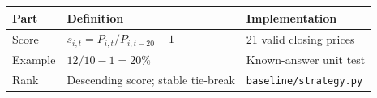 \begin{tabular}{@{}P{3.1cm}P{4.5cm}P{4.9cm}@{}}
\toprule
\textbf{Part} & \textbf{Definition} & \textbf{Implementation} \\
\midrule
Score & $s_{i,t}=P_{i,t}/P_{i,t-20}-1$ & 21 valid closing prices \\
Example & $12/10-1=20\%$ & Known-answer unit test \\
Rank & Descending score; stable tie-break & \texttt{baseline/strategy.py} \\
\bottomrule
\end{tabular}

